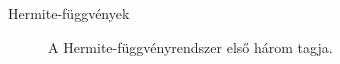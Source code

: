 \documentclass{beamer}
\begin{document}
\begin{frame}{Hermite-függvények}
{\begin{figure}
\caption{A Hermite-f\"uggv\'enyrendszer első három tagja.}
\label{fig:phi0-3}
\end{figure}

}
\end{frame}
\end{document}
